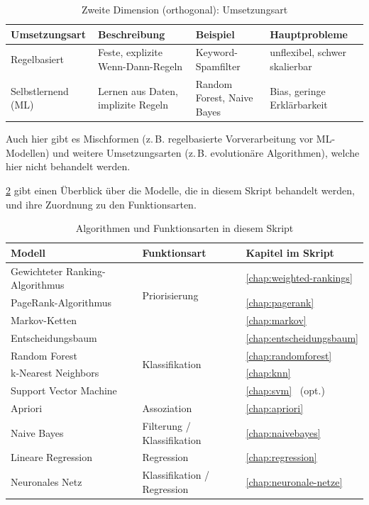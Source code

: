 \begin{table}[H]
\centering
\small
\begin{tabular}{p{3.0cm}p{5.1cm}p{2.5cm}p{3.0cm}}
\toprule
\textbf{Umsetzungsart} & \textbf{Beschreibung} & \textbf{Beispiel} & \textbf{Hauptprobleme} \\
\midrule
Regelbasiert & Feste, explizite Wenn-Dann-Regeln & Keyword-Spamfilter & unflexibel, schwer skalierbar \\
\midrule
Selbstlernend (ML) & Lernen aus Daten, implizite Regeln & Random Forest, Naive Bayes & Bias, geringe Erklärbarkeit \\
\bottomrule
\end{tabular}
\caption{Zweite Dimension (orthogonal): Umsetzungsart}
\label{tab:algorithmus-umsetzungsarten-15}
\end{table}

Auch hier gibt es Mischformen (z.\,B. regelbasierte Vorverarbeitung vor ML-Modellen) und weitere Umsetzungsarten (z.\,B. evolutionäre Algorithmen), welche hier nicht behandelt werden.

\cref{tab:modelle-uebersicht-15} gibt einen Überblick über die Modelle, die in diesem Skript behandelt werden, und ihre Zuordnung zu den Funktionsarten.

\begin{table}[H]
\centering
\small
\begin{tabular}{l|p{2.4cm}l}
\toprule
\textbf{Modell} & \textbf{Funktionsart} & \textbf{Kapitel im Skript} \\
\midrule
Gewichteter Ranking-Algorithmus & \multirow{3}{*}{Priorisierung} & \cref{chap:weighted-rankings}\\
PageRank-Algorithmus &  & \cref{chap:pagerank}\\
Markov-Ketten &  & \cref{chap:markov} \\\midrule
Entscheidungsbaum & \multirow{4}{*}{Klassifikation} & \cref{chap:entscheidungsbaum} \\
Random Forest &  & \cref{chap:randomforest} \\
k-Nearest Neighbors &  & \cref{chap:knn} \\
Support Vector Machine &  & \cref{chap:svm} \, (opt.) \\\midrule
Apriori & Assoziation & \cref{chap:apriori} \\\midrule
Naive Bayes & Filterung / Klassifikation & \cref{chap:naivebayes} \\\midrule
Lineare Regression & Regression & \cref{chap:regression} \\\midrule
Neuronales Netz & Klassifikation / Regression & \cref{chap:neuronale-netze}\\
\bottomrule
\end{tabular}
\caption{Algorithmen und Funktionsarten in diesem Skript}
\label{tab:modelle-uebersicht-15}
\end{table}

